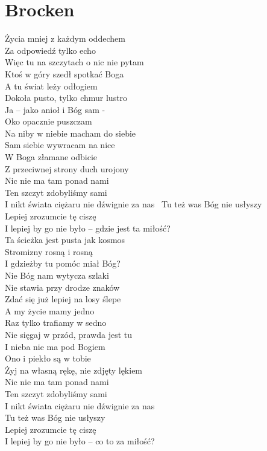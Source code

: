 \section{Brocken}
\noindent %
\begin{minipage}[t]{\dimexpr.4\textwidth-.4\columnsep}
    Życia mniej z każdym oddechem\\
    Za odpowiedź tylko echo\\
    Więc tu na szczytach o nic nie pytam\\
    \hfill\break
    Ktoś w góry szedł spotkać Boga\\
    A tu świat leży odłogiem\\
    Dokoła pusto, tylko chmur lustro\\
    \hfill\break
    Ja – jako anioł i Bóg sam -\\
    Oko opacznie puszczam\\
    Na niby w niebie macham do siebie\\
    \hfill\break
    Sam siebie wywracam na nice\\
    W Boga złamane odbicie\\
    Z przeciwnej strony duch urojony\\
    \hfill\break
    Nic nie ma tam ponad nami\\
    Ten szczyt zdobyliśmy sami\\
    I nikt świata ciężaru nie dźwignie za nas\
    \hfill\break
    Tu też was Bóg nie usłyszy\\
    Lepiej zrozumcie tę ciszę\\
    I lepiej by go nie było – gdzie jest ta miłość?\\
    \hfill\break
    Ta ścieżka jest pusta jak kosmos\\
    Stromizny rosną i rosną\\
    I gdzieżby tu pomóc miał Bóg?\\
    \hfill\break
    Nie Bóg nam wytycza szlaki\\
    Nie stawia przy drodze znaków\\
    Zdać się już lepiej na losy ślepe\\
    \hfill\break
    A my życie mamy jedno\\
    Raz tylko trafiamy w sedno\\
    Nie sięgaj w przód, prawda jest tu\\
    \hfill\break
    I nieba nie ma pod Bogiem\\
    Ono i piekło są w tobie\\
    Żyj na własną rękę, nie zdjęty lękiem\\
    \hfill\break
    Nic nie ma tam ponad nami\\
    Ten szczyt zdobyliśmy sami\\
    I nikt świata ciężaru nie dźwignie za nas\\
    \hfill\break
    Tu też was Bóg nie usłyszy\\
    Lepiej zrozumcie tę ciszę\\
    I lepiej by go nie było – co to za miłość?\\
\end{minipage}
